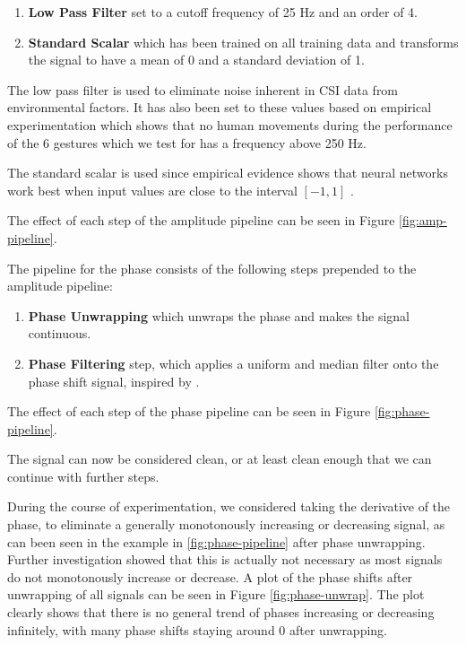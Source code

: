\begin{enumerate}
	\item \textbf{Low Pass Filter} set to a cutoff frequency of 25 Hz and an order of 4.
	\item \textbf{Standard Scalar} which has been trained on all training data and transforms the signal to have a mean of 0 and a standard deviation of 1.
\end{enumerate}

The low pass filter is used to eliminate noise inherent in CSI data from environmental factors.
It has also been set to these values based on empirical experimentation which shows that no human movements during the performance of the 6 gestures which we test for has a frequency above 250 Hz.

The standard scalar is used since empirical evidence shows that neural networks work best when input values are close to the interval $[-1, 1]$ \cite{varun2023tuning}.

The effect of each step of the amplitude pipeline can be seen in Figure \ref{fig:amp-pipeline}.

The pipeline for the phase consists of the following steps prepended to the amplitude pipeline:
\begin{enumerate}
	\item \textbf{Phase Unwrapping} which unwraps the phase and makes the signal continuous.
	\item \textbf{Phase Filtering} step, which applies a uniform and median filter onto the phase shift signal, inspired by \cite{oerlemans2022effect}.
\end{enumerate}

The effect of each step of the phase pipeline can be seen in Figure \ref{fig:phase-pipeline}.

The signal can now be considered clean, or at least clean enough that we can continue with further steps.

During the course of experimentation, we considered taking the derivative of the phase, to eliminate a generally monotonously increasing or decreasing signal, as can been seen in the example in \ref{fig:phase-pipeline} after phase unwrapping.
Further investigation showed that this is actually not necessary as most signals do not monotonously increase or decrease.
A plot of the phase shifts after unwrapping of all signals can be seen in Figure \ref{fig:phase-unwrap}.
The plot clearly shows that there is no general trend of phases increasing or decreasing infinitely, with many phase shifts staying around 0 after unwrapping.

